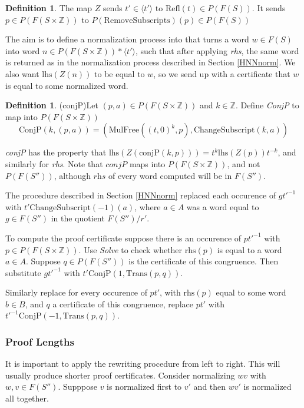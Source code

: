\documentclass[11pt]{article} %
\theoremstyle{definition}
\theoremstyle{definition}
\theoremstyle{definition}
\theoremstyle{definition}
\theoremstyle{definition}
\newtheorem{defn}[theorem]{Definition}
\theoremstyle{definition}
\begin{document}
\begin{defn}
  The map $Z$ sends $t' \in \langle t' \rangle$ to $\text{Refl}(t) \in P(F(S))$.
  It sends $p \in P(F(S \times \mathbb{Z}))$ to $P(\text{RemoveSubscripts})(p) \in P(F(S))$
\end{defn}

The aim is to define a normalization process into that turns a word $w \in F(S)$ into
word $n \in P(F(S \times \mathbb{Z})) \ast \langle t' \rangle$,
such that after applying \textit{rhs}, the same word is returned as in the
normalization process described in Section \ref{HNNnorm}. We also want
$\text{lhs}(Z(n))$ to be equal to $w$, so we send up with a certificate that $w$
is equal to some normalized word.

\begin{defn}(conjP)\label{conjP}
  Let $(p, a) \in P(F(S \times \mathbb{Z}))$ and $k \in \mathbb{Z}$.
  Define \textit{ConjP} to map into $P(F(S \times \mathbb{Z}))$
  \begin{equation}
    \text{ConjP}(k, (p, a)) = (\text{MulFree}((t,0)^k, p), \text{ChangeSubscript}(k, a))
  \end{equation}
\end{defn}

\textit{conjP} has the property that $\text{lhs}(Z(\text{conjP}(k, p))) = t^k \text{lhs}(Z(p))t^{-k}$,
and similarly for \textit{rhs}. Note that $\textit{conjP}$ maps into $P(F(S \times \mathbb{Z}))$,
and not $P(F(S''))$, although $\textit{rhs}$ of every word computed
will be in $F(S'')$.

The procedure described in Section \ref{HNNnorm}
replaced each occurence of $gt'^{-1}$ with $t'\text{ChangeSubscript}(-1)(a)$,
where $a \in A$ was a word equal to $g \in F(S'')$ in the quotient
$F(S'') / r'$.

To compute the proof certificate suppose there is an occurence of $pt'^{-1}$ with
$p \in P(F(S \times \mathbb{Z}))$. Use \textit{Solve} to check whether $\text{rhs}(p)$ is
equal to a word $a \in A$. Suppose $q \in  P(F(S''))$ is the certificate
of this congruence. Then substitute $gt'^{-1}$ with $t'\text{ConjP}(1, \text{Trans}(p, q))$.

Similarly replace for every occurence of $pt'$, with $\text{rhs}(p)$ equal to some word $b \in B$,
and $q$ a certificate of this congruence, replace $pt'$ with $t'^{-1}\text{ConjP}(-1, \text{Trans}(p, q))$.

\subsubsection{Proof Lengths}

It is important to apply the rewriting procedure from left to right. This will usually
produce shorter proof certificates. Consider normalizing $w v$ with $w, v \in F(S'')$.
Supppose $v$ is normalized first to $v'$ and then $wv'$ is normalized all together.
\end{document}
